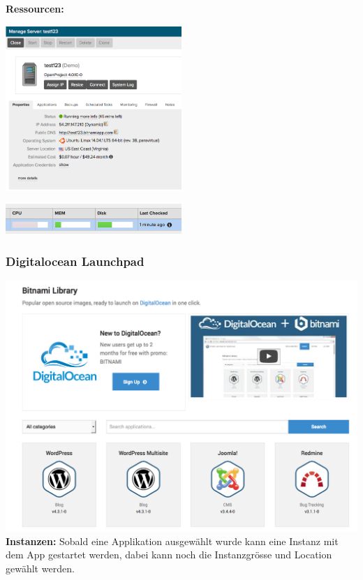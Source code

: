 \documentclass[11pt]{scrartcl}
\begin{document}
\textbf{Ressourcen:}

\includegraphics[width=0.5\textwidth]{aws_managment}

\includegraphics[width=0.5\textwidth]{aws_resrouces}

\newpage
\subsubsection{Digitalocean Launchpad}
\includegraphics[width=\textwidth]{digitalocean_launchpad}
\textbf{Instanzen:}
Sobald eine Applikation ausgewählt wurde kann eine Instanz mit dem App gestartet 
werden, dabei kann noch die Instanzgrösse und Location gewählt werden.
\end{document}
